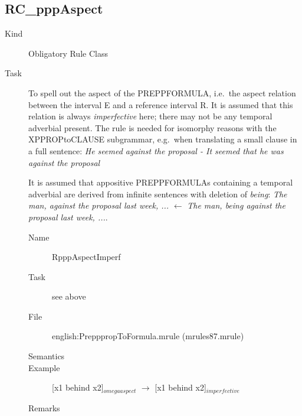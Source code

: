 \subsection{RC\_pppAspect}
\begin{description}
\item[Kind] Obligatory Rule Class
\item[Task] To spell out the aspect of the PREPPFORMULA, i.e.\ the aspect 
relation between the interval E and a reference interval R. It is assumed that 
this relation is always {\em imperfective\/} here; there may not be any 
temporal adverbial present. The rule is needed for isomorphy reasons with 
the XPPROPtoCLAUSE subgrammar, e.g.\ when translating a small clause in a full 
sentence: {\em He seemed against the proposal - It seemed that he was 
against the proposal\/}

It is assumed that appositive PREPPFORMULAs containing a temporal adverbial are 
derived from infinite sentences with deletion of {\em being\/}: {\em The man, 
against the proposal last week, ...\/} $\leftarrow$ {\em The man, being 
against the proposal last week, ...\/}.

\vspace{1 cm}
\begin{description}
\item[Name] RpppAspectImperf
\item[Task] see above
\item[File] english:PrepppropToFormula.mrule (mrules87.mrule)
\item[Semantics]
\item[Example] [x1 behind x2]$_{omegaaspect}$ $\rightarrow$ [x1 behind x2]$_{
imperfective}$
\item[Remarks]
\end{description}

\end{description}

\newpage
